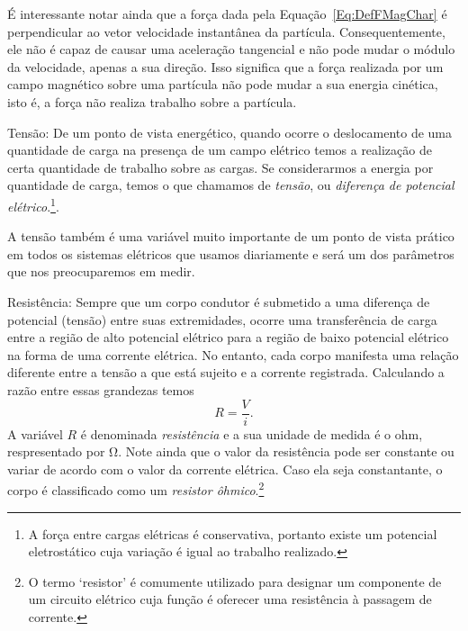\begin{description}
    É interessante notar ainda que a força dada pela Equação~\ref{Eq:DefFMagChar} é perpendicular ao vetor velocidade instantânea da partícula. Consequentemente, ele não é capaz de causar uma aceleração tangencial e não pode mudar o módulo da velocidade, apenas a sua direção. Isso significa que a força realizada por um campo magnético sobre uma partícula não pode mudar a sua energia cinética, isto é, a força não realiza trabalho sobre a partícula.
    
    \item{Tensão:} De um ponto de vista energético, quando ocorre o deslocamento de uma quantidade de carga na presença de um campo elétrico temos a realização de certa quantidade de trabalho sobre as cargas. Se considerarmos a energia por quantidade de carga, temos o que chamamos de \emph{tensão}, ou \emph{diferença de potencial elétrico}.\footnote{A força entre cargas elétricas é conservativa, portanto existe um potencial eletrostático cuja variação é igual ao trabalho realizado.}.
    
    A tensão também é uma variável muito importante de um ponto de vista prático em todos os sistemas elétricos que usamos diariamente e será um dos parâmetros que nos preocuparemos em medir.
    
    \item{Resistência:} Sempre que um corpo condutor é submetido a uma diferença de potencial (tensão) entre suas extremidades, ocorre uma transferência de carga entre a região de alto potencial elétrico para a região de baixo potencial elétrico na forma de uma corrente elétrica. No entanto, cada corpo manifesta uma relação diferente entre a tensão a que está sujeito e a corrente registrada. Calculando a razão entre essas grandezas temos
    \begin{equation}
        R = \frac{V}{i}.
    \end{equation}
    A variável $R$ é denominada \emph{resistência} e a sua unidade de medida é o ohm, respresentado por \si{\ohm}. Note ainda que o valor da resistência pode ser constante ou variar de acordo com o valor da corrente elétrica. Caso ela seja constantante, o corpo é classificado como um \emph{resistor ôhmico}.\footnote{O termo `resistor' é comumente utilizado para designar um componente de um circuito elétrico cuja função é oferecer uma resistência à passagem de corrente.}
    
\end{description}

